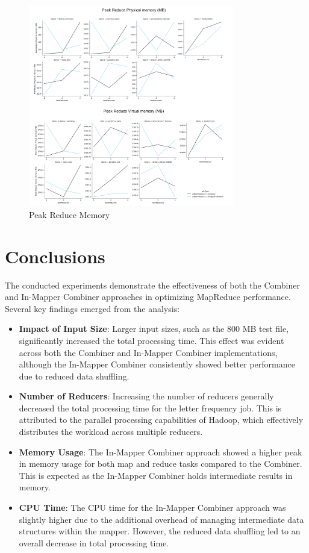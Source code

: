 \documentclass[a4paper, 12pt]{article}
\begin{document}
\begin{figure}[H]
  \centering
  \includegraphics[width=0.8\textwidth]{media/performance/PeakReduceMemory.png}
  \caption{Peak Reduce Memory}
  \label{fig:PeakReduceMemory}
\end{figure}

\newpage
\section{Conclusions}
The conducted experiments demonstrate the effectiveness of both the Combiner and In-Mapper Combiner approaches in optimizing MapReduce performance. Several key findings emerged from the analysis:

\begin{itemize}
\item \textbf{Impact of Input Size}: Larger input sizes, such as the 800 MB test file, significantly increased the total processing time. This effect was evident across both the Combiner and In-Mapper Combiner implementations, although the In-Mapper Combiner consistently showed better performance due to reduced data shuffling.
\item \textbf{Number of Reducers}: Increasing the number of reducers generally decreased the total processing time for the letter frequency job. This is attributed to the parallel processing capabilities of Hadoop, which effectively distributes the workload across multiple reducers.
\item \textbf{Memory Usage}: The In-Mapper Combiner approach showed a higher peak in memory usage for both map and reduce tasks compared to the Combiner. This is expected as the In-Mapper Combiner holds intermediate results in memory.
\item \textbf{CPU Time}: The CPU time for the In-Mapper Combiner approach was slightly higher due to the additional overhead of managing intermediate data structures within the mapper. However, the reduced data shuffling led to an overall decrease in total processing time.
\end{itemize}
\end{document}
